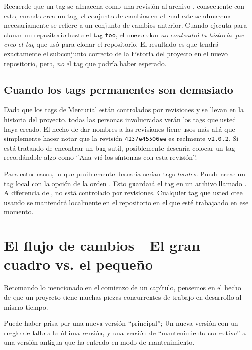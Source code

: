 Recuerde que un tag se almacena como una revisión al archivo
, consecuente con esto, cuando crea un tag, el
conjunto de cambios en el cual este se almacena necesariamente se
refiere a un conjunto de cambios anterior. Cuando ejecuta
 para clonar un repositorio hasta el tag
\texttt{foo}, el nuevo clon \emph{no contendrá la historia que creo
el tag} que usó para clonar el repositorio. El resultado es que tendrá
exactamente el subconjunto correcto de la historia del proyecto en el
nuevo repositorio, pero, \emph{no} el tag que podría haber esperado.

\subsection{Cuando los tags permanentes son demasiado}

Dado que los tags de Mercurial están controlados por revisiones y se
llevan en la historia del proyecto, todas las personas involucradas
verán los tags que usted haya creado. El hecho de dar nombres a las
revisiones tiene usos más allá que simplemente hacer notar que la
revisión \texttt{4237e45506ee} es realmente \texttt{v2.0.2}.  Si está
tratando de encontrar un bug sutil, posiblemente desearía colocar un
tag recordándole algo como ``Ana vió los síntomas con esta revisión''.

Para estos casos, lo que posiblemente desearía serían tags
\emph{locales}. Puede crear un tag local con la opción 
de la orden .  Esto guardará el tag en un archivo llamado
.  A diferencia de ,
 no está controlado por revisiones.
Cualquier tag que usted cree usando  se mantendrá
localmente en el repositorio en el que esté trabajando en ese momento.

\section{El flujo de cambios---El gran cuadro vs. el pequeño}

Retomando lo mencionado en el comienzo de un capítulo, pensemos en el
hecho de que un proyecto tiene muchas piezas concurrentes de trabajo
en desarrollo al mismo tiempo.

Puede haber prisa por una nueva versión ``principal''; Un nueva
versión con un rreglo de fallo a la última versión; y una versión de
``mantenimiento correctivo'' a una versión antigua que ha entrado en
modo de mantenimiento.

